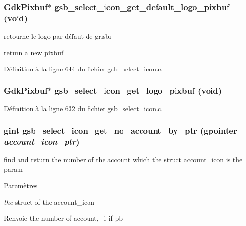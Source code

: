 \subsubsection[{gsb\_\-select\_\-icon\_\-get\_\-default\_\-logo\_\-pixbuf}]{\setlength{\rightskip}{0pt plus 5cm}GdkPixbuf$\ast$ gsb\_\-select\_\-icon\_\-get\_\-default\_\-logo\_\-pixbuf (void)}\label{gsb__select__icon_8h_af1fb4010382ca36d7a6136eaf2b1e560}
retourne le logo par défaut de grisbi

return a new pixbuf 

Définition à la ligne 644 du fichier gsb\_\-select\_\-icon.c.

\subsubsection[{gsb\_\-select\_\-icon\_\-get\_\-logo\_\-pixbuf}]{\setlength{\rightskip}{0pt plus 5cm}GdkPixbuf$\ast$ gsb\_\-select\_\-icon\_\-get\_\-logo\_\-pixbuf (void)}\label{gsb__select__icon_8h_ab94baafcefa2186ea14a52afead216c5}


Définition à la ligne 632 du fichier gsb\_\-select\_\-icon.c.

\subsubsection[{gsb\_\-select\_\-icon\_\-get\_\-no\_\-account\_\-by\_\-ptr}]{\setlength{\rightskip}{0pt plus 5cm}gint gsb\_\-select\_\-icon\_\-get\_\-no\_\-account\_\-by\_\-ptr (gpointer {\em account\_\-icon\_\-ptr})}\label{gsb__select__icon_8h_a6f0518fa0e7946b6ec40427f21375fac}
find and return the number of the account which the struct account\_\-icon is the param


\begin{DoxyParams}{Paramètres}
\item[{\em the}]struct of the account\_\-icon\end{DoxyParams}
\begin{DoxyReturn}{Renvoie}
the number of account, -\/1 if pb 
\end{DoxyReturn}


